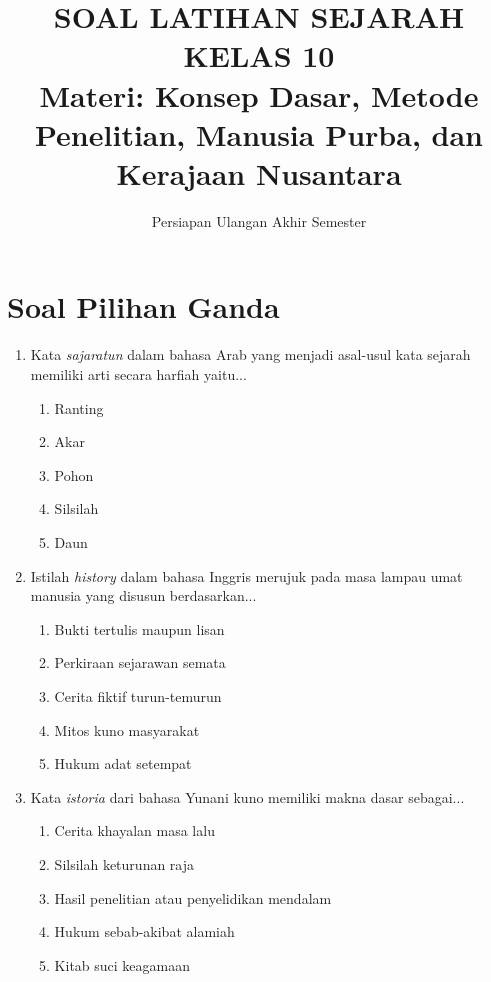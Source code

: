 \documentclass[12pt, a4paper]{article}
\title{SOAL LATIHAN SEJARAH KELAS 10\\ \large Materi: Konsep Dasar, Metode Penelitian, Manusia Purba, dan Kerajaan Nusantara}
\author{Persiapan Ulangan Akhir Semester}
\date{}
\begin{document}
\maketitle

\newpage

\section*{Soal Pilihan Ganda}

\begin{enumerate}[label=\arabic*.]

    \item Kata \textit{sajaratun} dalam bahasa Arab yang menjadi asal-usul kata sejarah memiliki arti secara harfiah yaitu...
    \begin{enumerate}[label=\Alph*.]
        \item Ranting
        \item Akar
        \item Pohon
        \item Silsilah
        \item Daun
    \end{enumerate}

    \item Istilah \textit{history} dalam bahasa Inggris merujuk pada masa lampau umat manusia yang disusun berdasarkan...
    \begin{enumerate}[label=\Alph*.]
        \item Bukti tertulis maupun lisan
        \item Perkiraan sejarawan semata
        \item Cerita fiktif turun-temurun
        \item Mitos kuno masyarakat
        \item Hukum adat setempat
    \end{enumerate}

    \item Kata \textit{istoria} dari bahasa Yunani kuno memiliki makna dasar sebagai...
    \begin{enumerate}[label=\Alph*.]
        \item Cerita khayalan masa lalu
        \item Silsilah keturunan raja
        \item Hasil penelitian atau penyelidikan mendalam
        \item Hukum sebab-akibat alamiah
        \item Kitab suci keagamaan
    \end{enumerate}


\end{enumerate}
\end{document}
